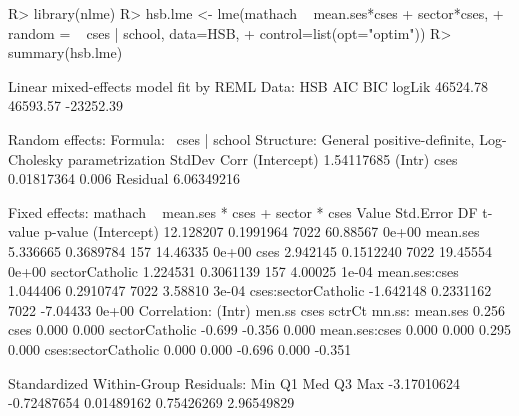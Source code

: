\documentclass[
]{jss}
\begin{document}
\begin{CodeChunk}
\begin{CodeInput}
R> library(nlme)
R> hsb.lme <- lme(mathach ~ mean.ses*cses + sector*cses,
+                  random = ~ cses | school, data=HSB,
+                control=list(opt="optim"))
R> summary(hsb.lme)
\end{CodeInput}
\begin{CodeOutput}
Linear mixed-effects model fit by REML
  Data: HSB 
       AIC      BIC    logLik
  46524.78 46593.57 -23252.39

Random effects:
 Formula: ~cses | school
 Structure: General positive-definite, Log-Cholesky parametrization
            StdDev     Corr  
(Intercept) 1.54117685 (Intr)
cses        0.01817364 0.006 
Residual    6.06349216       

Fixed effects:  mathach ~ mean.ses * cses + sector * cses 
                        Value Std.Error   DF  t-value p-value
(Intercept)         12.128207 0.1991964 7022 60.88567   0e+00
mean.ses             5.336665 0.3689784  157 14.46335   0e+00
cses                 2.942145 0.1512240 7022 19.45554   0e+00
sectorCatholic       1.224531 0.3061139  157  4.00025   1e-04
mean.ses:cses        1.044406 0.2910747 7022  3.58810   3e-04
cses:sectorCatholic -1.642148 0.2331162 7022 -7.04433   0e+00
 Correlation: 
                    (Intr) men.ss cses   sctrCt mn.ss:
mean.ses             0.256                            
cses                 0.000  0.000                     
sectorCatholic      -0.699 -0.356  0.000              
mean.ses:cses        0.000  0.000  0.295  0.000       
cses:sectorCatholic  0.000  0.000 -0.696  0.000 -0.351

Standardized Within-Group Residuals:
        Min          Q1         Med          Q3         Max 
-3.17010624 -0.72487654  0.01489162  0.75426269  2.96549829 


\end{CodeOutput}
\end{CodeChunk}
\end{document}
